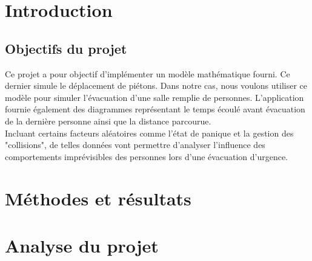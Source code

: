 \documentclass[twoside,UTF8]{EPURapport}
\begin{document}
\chapter{Introduction}
	\section{Objectifs du projet}
	Ce projet a pour objectif d'implémenter un modèle mathématique fourni. Ce dernier simule le déplacement de piétons. Dans notre cas, nous voulons utiliser ce modèle pour simuler l'évacuation d'une salle remplie de personnes. L'application fournie également des diagrammes représentant le temps écoulé avant évacuation de la dernière personne ainsi que la distance parcourue.\\
	Incluant certains facteurs aléatoires comme l'état de panique et la gestion des "collisions", de telles données vont permettre d'analyser l'influence des comportements imprévisibles des personnes lors d'une évacuation d'urgence.
	
\chapter{Méthodes et résultats}

	

	
	
	
		
\chapter{Analyse du projet}
	
	
	
	
	
\annexes
\end{document}
